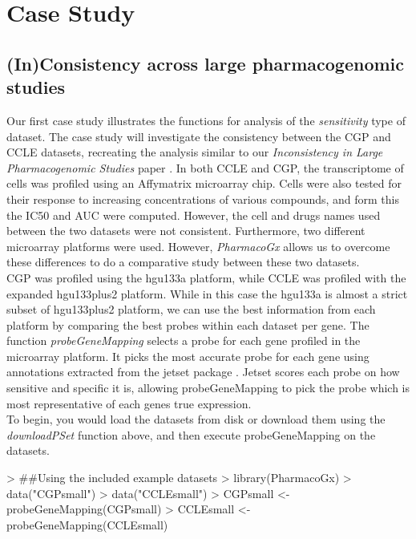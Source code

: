 \documentclass[11pt]{article}
\begin{document}
\section{Case Study}

\subsection{(In)Consistency across large pharmacogenomic studies}
Our first case study illustrates the functions for analysis of the \textit{sensitivity} type of dataset. The case study will investigate the consistency between the CGP and CCLE datasets, recreating the analysis similar to our \textit{Inconsistency in Large Pharmacogenomic Studies} paper \cite{HaibeKains:2013ie}. In both CCLE and CGP, the transcriptome of cells was profiled using an Affymatrix microarray chip. Cells were also tested for their response to increasing concentrations of various compounds, and form this the IC50 and AUC were computed. However, the cell and drugs names used between the two datasets were not consistent. Furthermore, two different microarray platforms were used. However, \textit{PharmacoGx} allows us to overcome these differences to do a comparative study between these two datasets. \\


CGP was profiled using the hgu133a platform, while CCLE was profiled with the expanded hgu133plus2 platform. While in this case the hgu133a is almost a strict subset of hgu133plus2 platform, we can use the best information from each platform by comparing the best probes within each dataset per gene. The function \textit{probeGeneMapping} selects a probe for each gene profiled in the microarray platform. It picks the most accurate probe for each gene using annotations extracted from the jetset package \cite{Li:2011cc}. Jetset scores each probe on how sensitive and specific it is, allowing probeGeneMapping to pick the probe which is most representative of each genes true expression. \\

To begin, you would load the datasets from disk or download them using the \textit{downloadPSet} function above, and then execute probeGeneMapping on the datasets. 

\begin{Schunk}
\begin{Sinput}
>   ##Using the included example datasets
>   library(PharmacoGx)
>   data("CGPsmall")
>   data("CCLEsmall")
>   CGPsmall <- probeGeneMapping(CGPsmall) 
>   CCLEsmall <- probeGeneMapping(CCLEsmall) 
\end{Sinput}
\end{Schunk}
\end{document}

